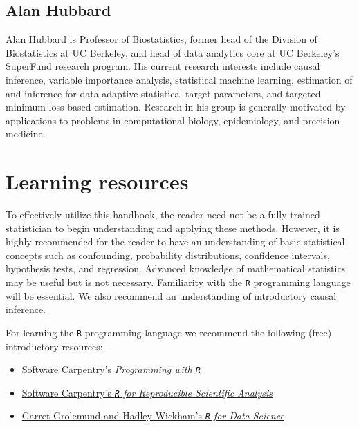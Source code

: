 \documentclass[
  12pt, krantz2,
]{krantz}
\newcommand{\passthrough}[1]{#1}
\providecommand{\tightlist}{%
  \setlength{\itemsep}{0pt}\setlength{\parskip}{0pt}}
\theoremstyle{definition}
\theoremstyle{definition}
\theoremstyle{definition}
\newcommand{\1}{\mathbbm{1}}
\begin{document}
\hypertarget{alan-hubbard}{%
\subsection*{Alan Hubbard}\label{alan-hubbard}}


Alan Hubbard is Professor of Biostatistics, former head of the Division of
Biostatistics at UC Berkeley, and head of data analytics core at UC Berkeley's
SuperFund research program. His current research interests include causal
inference, variable importance analysis, statistical machine learning,
estimation of and inference for data-adaptive statistical target parameters, and
targeted minimum loss-based estimation. Research in his group is generally
motivated by applications to problems in computational biology, epidemiology,
and precision medicine.

\hypertarget{learn}{%
\section{Learning resources}\label{learn}}

To effectively utilize this handbook, the reader need not be a fully trained
statistician to begin understanding and applying these methods. However, it is
highly recommended for the reader to have an understanding of basic statistical
concepts such as confounding, probability distributions, confidence intervals,
hypothesis tests, and regression. Advanced knowledge of mathematical statistics
may be useful but is not necessary. Familiarity with the \passthrough{\lstinline!R!} programming
language will be essential. We also recommend an understanding of introductory
causal inference.

For learning the \passthrough{\lstinline!R!} programming language we recommend the following (free)
introductory resources:

\begin{itemize}
\tightlist
\item
  \href{http://swcarpentry.github.io/r-novice-inflammation/}{Software Carpentry's \emph{Programming with
  \passthrough{\lstinline!R!}}}
\item
  \href{http://swcarpentry.github.io/r-novice-gapminder/}{Software Carpentry's \emph{\passthrough{\lstinline!R!} for Reproducible Scientific
  Analysis}}
\item
  \href{https://r4ds.had.co.nz}{Garret Grolemund and Hadley Wickham's \emph{\passthrough{\lstinline!R!} for Data
  Science}}
\end{itemize}
\end{document}
